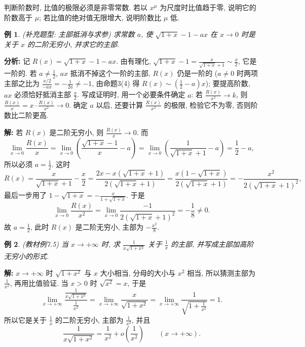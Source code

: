 \documentclass[UTF8,openany]{ctexbook}
\theoremstyle{chinesetextbook}
\newtheorem{example}{例}[section]
\newenvironment{cnsolution}{\par\indent\textbf{解:} \ignorespaces}{\par}
\begin{document}
判断阶数时, 比值的极限必须是非零常数. 若以 $x^\mu$ 为尺度时比值趋于零, 说明它的阶数高于 $\mu$; 若比值的绝对值无限增大, 说明阶数比 $\mu$ 低.
\begin{example}
\textnormal{(补充题型: 主部抵消与求参)} 求常数 $a$, 使 $\sqrt{1+x}-1-ax$ 在 $x\to0$ 时是关于 $x$ 的二阶无穷小, 并求它的主部.
\end{example}
\par\indent\textbf{分析:} 记 $R(x)=\sqrt{1+x}-1-ax$. 由有理化, $\displaystyle\sqrt{1+x}-1=\frac x{\sqrt{1+x}+1}\sim\frac x2$, 它是一阶的. 若 $\displaystyle a\ne\frac12$, $ax$ 抵消不掉这个一阶的主部, $R(x)$ 仍是一阶的 ($a\ne0$ 时两项主部之比为 $\displaystyle\frac{x/2}{-ax}=-\frac1{2a}\ne-1$, 由命题3(4) 得 $\displaystyle R(x)\sim\left(\frac12-a\right)x$); 要提高阶数, $ax$ 必须恰好抵消主部 $\displaystyle\frac x2$. 写成证明时, 用一个必要条件确定 $a$: 若 $\displaystyle\frac{R(x)}{x^2}\to k$, 则 $\displaystyle\frac{R(x)}x=x\cdot\frac{R(x)}{x^2}\to0$. 确定 $a$ 以后, 还要计算 $\displaystyle\frac{R(x)}{x^2}$ 的极限, 检验它不为零, 否则阶数比二阶更高.
\begin{cnsolution}
若 $R(x)$ 是二阶无穷小, 则 $\displaystyle\frac{R(x)}x\to0$. 而
\[
\lim_{x\to0}\frac{R(x)}x=\lim_{x\to0}\left(\frac{\sqrt{1+x}-1}x-a\right)=\lim_{x\to0}\left(\frac1{\sqrt{1+x}+1}-a\right)=\frac12-a,
\]
所以必须 $\displaystyle a=\frac12$. 这时
\[
R(x)=\frac x{\sqrt{1+x}+1}-\frac x2=\frac{2x-x\left(\sqrt{1+x}+1\right)}{2\left(\sqrt{1+x}+1\right)}=\frac{x\left(1-\sqrt{1+x}\right)}{2\left(\sqrt{1+x}+1\right)}=-\frac{x^2}{2\left(\sqrt{1+x}+1\right)^2},
\]
最后一步用了 $\displaystyle1-\sqrt{1+x}=-\frac x{1+\sqrt{1+x}}$. 于是
\[
\lim_{x\to0}\frac{R(x)}{x^2}=\lim_{x\to0}\frac{-1}{2\left(\sqrt{1+x}+1\right)^2}=-\frac18\ne0.
\]
故 $\displaystyle a=\frac12$, 此时 $R(x)$ 是二阶无穷小, 主部为 $\displaystyle-\frac{x^2}8$.
\end{cnsolution}
\begin{example}
\textnormal{(教材例7.5)} 当 $x\to+\infty$ 时, 求 $\displaystyle\frac1{x\sqrt{1+x^2}}$ 关于 $\displaystyle\frac1x$ 的主部, 并写成主部加高阶无穷小的形式.
\end{example}
\begin{cnsolution}
$x\to+\infty$ 时 $\sqrt{1+x^2}$ 与 $x$ 大小相当, 分母的大小与 $x^2$ 相当, 所以猜测主部为 $\displaystyle\frac1{x^2}$, 再用比值验证. 当 $x>0$ 时 $\sqrt{x^2}=x$, 于是
\[
\lim_{x\to+\infty}\frac{\frac1{x\sqrt{1+x^2}}}{\frac1{x^2}}=\lim_{x\to+\infty}\frac x{\sqrt{1+x^2}}=\lim_{x\to+\infty}\frac1{\sqrt{1+\frac1{x^2}}}=1.
\]
所以它是关于 $\displaystyle\frac1x$ 的二阶无穷小, 主部为 $\displaystyle\frac1{x^2}$, 并且
\[
\frac1{x\sqrt{1+x^2}}=\frac1{x^2}+o\!\left(\frac1{x^2}\right)\qquad(x\to+\infty).
\]
\end{cnsolution}
\end{document}
